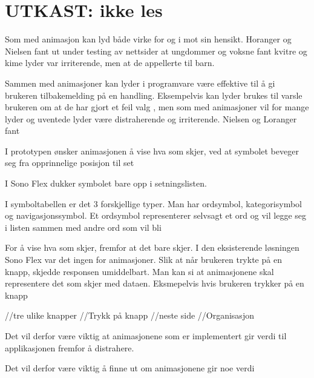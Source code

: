\documentclass[phd,tocprelim]{cornell}
\begin{document}
\printglossaries
\contentspage
\figurelistpage
\listoftodos

\normalspacing \setcounter{page}{1} 
\pagestyle{cornell} \addtolength{\parskip}{0.5\baselineskip}










\section{UTKAST: ikke les}


Som med animasjon kan lyd både virke for og i mot sin hensikt. Horanger og Nielsen fant ut under testing av nettsider at ungdommer og voksne fant kvitre og kime lyder var irriterende, men at de appellerte til barn. 

Sammen med animasjoner kan lyder i programvare være effektive til å gi brukeren tilbakemelding på en handling. Eksempelvis kan lyder brukes til varsle brukeren om at de har gjort et feil valg \cite{}, men som med animasjoner vil for mange lyder og uventede lyder være distraherende og irriterende. Nielsen og Loranger fant 




I prototypen ønsker animasjonen å vise hva som skjer,  ved at symbolet beveger seg fra opprinnelige posisjon til set

I Sono Flex dukker symbolet bare opp i setningslisten.

I symboltabellen er det 3 forskjellige typer. Man har 
ordsymbol, kategorisymbol og navigasjonssymbol. Et ordsymbol representerer selvsagt et ord og vil legge seg i listen sammen med andre ord som vil bli 

For å vise hva som skjer, fremfor at det bare skjer. I den eksisterende løsningen Sono Flex var det ingen for animasjoner. Slik at når brukeren trykte på en knapp, skjedde responsen umiddelbart. Man kan si at animasjonene skal representere det som skjer med dataen. Eksmepelvis hvis brukeren trykker på en knapp 


//tre ulike knapper
    //Trykk på knapp
    //neste side
    //Organisasjon



Det vil derfor være viktig at animasjonene som er implementert gir verdi til applikasjonen fremfor å distrahere.

Det vil derfor være viktig å finne ut om animasjonene gir noe verdi 
\end{document}
